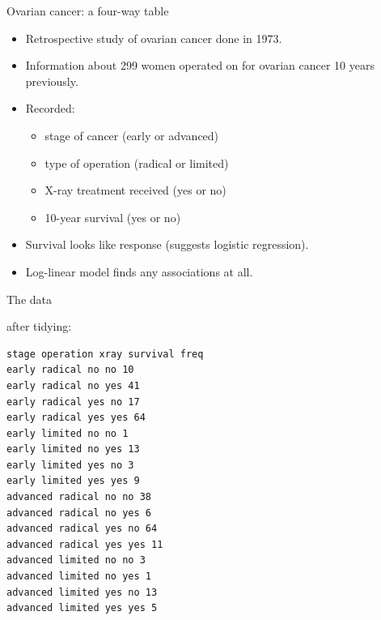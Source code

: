 \documentclass[unknownkeysallowed]{beamer}\usepackage[]{graphicx}\usepackage[]{color}
\begin{document}
\begin{frame}[fragile]{Ovarian cancer: a four-way table}

  \begin{itemize}
  \item Retrospective study of ovarian cancer done in 1973.
  \item Information about 299 women operated on for ovarian cancer 10 years previously.
  \item Recorded:
    \begin{itemize}
    \item stage of cancer (early or advanced)
    \item type of operation (radical or limited)
    \item X-ray treatment received (yes or no)
    \item 10-year survival (yes or no)
    \end{itemize}
  \item Survival looks like response (suggests logistic
    regression).

  \item Log-linear model finds any associations at all.
  \end{itemize}
  
\end{frame}

 
\begin{frame}[fragile]{The data}

after tidying:

{\scriptsize
\begin{verbatim}
stage operation xray survival freq
early radical no no 10
early radical no yes 41
early radical yes no 17
early radical yes yes 64
early limited no no 1
early limited no yes 13
early limited yes no 3
early limited yes yes 9
advanced radical no no 38
advanced radical no yes 6
advanced radical yes no 64
advanced radical yes yes 11
advanced limited no no 3
advanced limited no yes 1
advanced limited yes no 13
advanced limited yes yes 5

\end{verbatim}
}

\end{frame}
\end{document}
